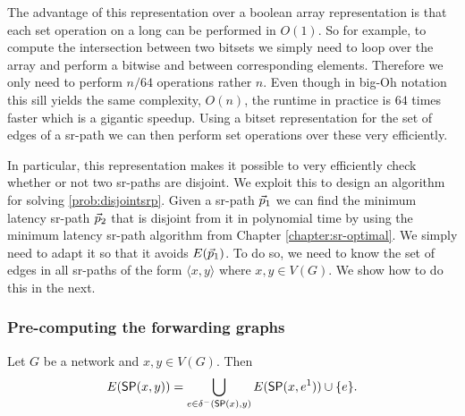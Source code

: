 The advantage of this representation over a boolean array representation is that each set operation on a long can be performed in $O(1)$.
So for example, to compute the intersection between two bitsets we simply need to loop over the array and perform a bitwise and between
corresponding elements. Therefore we only need to perform $n \slash 64$ operations rather $n$. Even though in big-Oh notation this sill yields
the same complexity, $O(n)$, the runtime in practice is $64$ times faster which is a gigantic speedup.
Using a bitset representation for the set of edges of a sr-path we can then perform set operations over these very efficiently. 

In particular, this representation makes it possible to very efficiently check whether or not two sr-paths are disjoint. We exploit this to
design an algorithm for solving \ref{prob:disjointsrp}. Given a sr-path $\vec{p}_1$ we can find the minimum latency sr-path $\vec{p}_2$ that
is disjoint from it in polynomial time by using the minimum latency sr-path algorithm from Chapter \ref{chapter:sr-optimal}. We simply need to
adapt it so that it avoids $E(\vec{p}_1)$. To do so, we need to know the set of edges in all sr-paths of the form $\langle x, y \rangle$
where $x, y \in V(G)$. We show how to do this in the next.

\subsubsection{Pre-computing the forwarding graphs}

\begin{lemma}
\label{lemma:forwdp}
Let $G$ be a network and $x, y \in V(G)$. Then
\begin{equation}
\label{eq:forwdp}
E(\mathsf{SP}(x, y)) = \bigcup_{ e \in \delta^-(\mathsf{SP}(x), y) } E(\mathsf{SP}(x, e^1)) \cup \{ e \}.
\end{equation}
\end{lemma}

